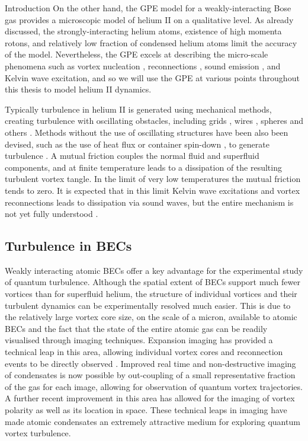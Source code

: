 \begin{chapter}{\label{cha:bose_gases}Introduction}
On the other hand, the GPE model for a weakly-interacting Bose gas provides a microscopic model of helium II on a qualitative level. As already discussed, the strongly-interacting helium atoms, existence of high momenta rotons, and relatively low fraction of condensed helium atoms limit the accuracy of the model. Nevertheless, the GPE excels at describing the micro-scale phenomena such as vortex nucleation \cite{frisch92}, reconnections \cite{PhysRevLett.71.1375, PhysRevLett.76.4745}, sound emission \cite{leadbeater,PhysRevA.69.053601}, and Kelvin wave excitation, and so we will use the GPE at various points throughout this thesis to model helium II dynamics.

Typically turbulence in helium II is generated using mechanical methods, creating turbulence with oscillating obstacles, including grids \cite{Davis2000}, wires \cite{Guenault1986,Bradley2011,Fisher2001}, spheres \cite{Schoepe1995} and others \cite{Blaauwgeers2007,Bradley2012,Tabeling1998,Salort,VinenSkrbek2008}. Methods without the use of oscillating structures have been also been devised, such as the use of heat flux \cite{Vinen114} or container spin-down \cite{PhysRevLett.99.265302}, to generate turbulence . A mutual friction \cite{Donnelly} couples the normal fluid and superfluid components, and at finite temperature leads to a dissipation of the resulting turbulent vortex tangle. In the limit of very low temperatures the mutual friction tends to zero. It is expected that in this limit Kelvin wave excitations \cite{leadbeater,PhysRevA.69.053601} and vortex reconnections leads to dissipation via sound waves, but the entire mechanism is not yet fully understood \cite{PhysRevB.61.1410}.

\subsection{Turbulence in BECs}

Weakly interacting atomic BECs offer a key advantage for the experimental study of quantum turbulence. Although the spatial extent of BECs support much fewer vortices than for superfluid helium, the structure of individual vortices and their turbulent dynamics can be experimentally resolved much easier. This is due to the relatively large vortex core size, on the scale of a micron, available to atomic BECs and the fact that the state of the entire atomic gas can be readily visualised through imaging techniques. Expansion imaging has provided a technical leap in this area, allowing individual vortex cores and reconnection events to be directly observed \cite{PhysRevLett.84.806,Raman01,kwon_moon_14}. Improved real time and non-destructive imaging of condensates is now possible \cite{Freilich2010} by out-coupling of a small representative fraction of the gas for each image, allowing for observation of quantum vortex trajectories. A further recent improvement in this area \cite{powis} has allowed for the imaging of vortex polarity as well as its location in space. These technical leaps in imaging have made atomic condensates an extremely attractive medium for exploring quantum vortex turbulence. 


\end{chapter}
